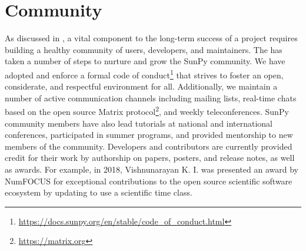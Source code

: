\section{Community}
\label{sec:community}

As discussed in \citet{bangerth2013}, a vital component to the long-term success of a project requires building a healthy community of users, developers, and maintainers.
The \sunpyproj has taken a number of steps to nurture and grow the SunPy community.
We have adopted and enforce a formal code of conduct\footnote{\url{https://docs.sunpy.org/en/stable/code_of_conduct.html}} that strives to foster an open, considerate, and respectful environment for all.
Additionally, we maintain a number of active communication channels including mailing lists, real-time chats based on the open source Matrix protocol\footnote{\url{https://matrix.org}}, and weekly teleconferences.
SunPy community members have also lead tutorials at national and international conferences, participated in summer programs, and provided mentorship to new members of the community.
Developers and contributors are currently provided credit for their work by authorship on papers, posters, and release notes, as well as awards.
For example, in 2018, Vishnunarayan K. I. was presented an award by NumFOCUS for exceptional contributions to the open source scientific software ecosystem by updating \sunpypkg to use a scientific time class.
